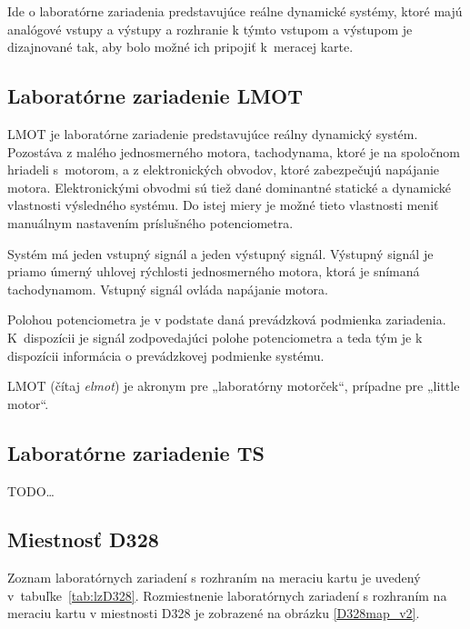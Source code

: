 \documentclass[a4paper, 10pt, ]{article}
\begin{document}
Ide o laboratórne zariadenia  predstavujúce reálne dynamické systémy, ktoré majú analógové vstupy a výstupy a rozhranie k týmto vstupom a výstupom je dizajnované tak, aby bolo možné ich pripojiť k~meracej karte.

\subsection{Laboratórne zariadenie LMOT}

LMOT je laboratórne zariadenie predstavujúce reálny dynamický systém. Pozostáva z malého jednosmerného motora, tachodynama, ktoré je na spoločnom hriadeli s~motorom, a z elektronických obvodov, ktoré zabezpečujú napájanie motora. Elektronickými obvodmi sú tiež dané dominantné statické a dynamické vlastnosti výsledného systému. Do istej miery je možné tieto vlastnosti meniť manuálnym nastavením príslušného potenciometra.

Systém má jeden vstupný signál a jeden výstupný signál. Výstupný signál je priamo úmerný uhlovej rýchlosti jednosmerného motora, ktorá je snímaná tachodynamom. Vstupný signál ovláda napájanie motora.

Polohou potenciometra je v podstate daná prevádzková podmienka zariadenia. K~dispozícii je signál zodpovedajúci polohe potenciometra a teda tým je k dispozícii informácia o prevádzkovej podmienke systému.

LMOT (čítaj \emph{elmot}) je akronym pre „laboratórny motorček“, prípadne pre „little motor“.




\subsection{Laboratórne zariadenie TS}

TODO\ldots






\subsection{Miestnosť D328}

Zoznam laboratórnych zariadení s rozhraním na meraciu kartu je uvedený v~tabuľke~\ref{tab:lzD328}. Rozmiestnenie laboratórnych zariadení s rozhraním na meraciu kartu v miestnosti D328 je zobrazené na obrázku \ref{D328map_v2}.



\end{document}
